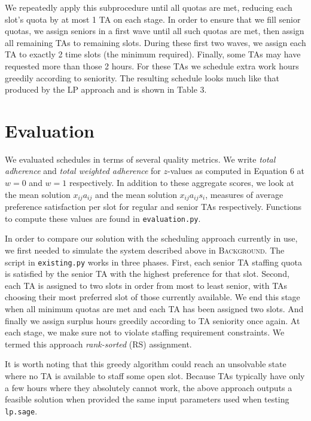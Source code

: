 \documentclass{article}
\begin{document}
\begin{multicols}{2}
We repeatedly apply this subprocedure until all quotas are met, reducing each slot's quota by at most 1 TA on each stage. In order to ensure that we fill senior quotas, we assign seniors in a first wave until all such quotas are met, then assign all remaining TAs to remaining slots. During these first two waves, we assign each TA to exactly 2 time slots (the minimum required). Finally, some TAs may have requested more than those 2 hours. For these TAs we schedule extra work hours greedily according to seniority. The resulting schedule looks much like that produced by the LP approach and is shown in Table 3.

\section*{Evaluation}

We evaluated schedules in terms of several quality metrics. We write \textit{total adherence} and \textit{total weighted adherence} for $z$-values as computed in Equation 6 at $w = 0$ and $w = 1$ respectively. In addition to these aggregate scores, we look at the mean solution $x_{ij}a_{ij}$ and the mean solution $x_{ij}a_{ij}s_i$, measures of average preference satisfaction per slot for regular and senior TAs respectively. Functions to compute these values are found in \texttt{evaluation.py}.

In order to compare our solution with the scheduling approach currently in use, we first needed to simulate the system described above in \textsc{Background}. The script in \texttt{existing.py} works in three phases. First, each senior TA staffing quota is satisfied by the senior TA with the highest preference for that slot. Second, each TA is assigned to two slots in order from most to least senior, with TAs choosing their most preferred slot of those currently available. We end this stage when all minimum quotas are met and each TA has been assigned two slots. And finally we assign surplus hours greedily according to TA seniority once again. At each stage, we make sure not to violate staffing requirement constraints. We termed this approach \textit{rank-sorted} (RS) assignment.

It is worth noting that this greedy algorithm could reach an unsolvable state where no TA is available to staff some open slot. Because TAs typically have only a few hours where they absolutely cannot work, the above approach outputs a feasible solution when provided the same input parameters used when testing \texttt{lp.sage}.


\end{multicols}
\end{document}
